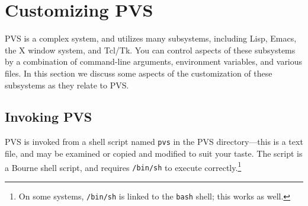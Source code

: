 \chapter{Customizing PVS}
\label{customization}

PVS is a complex system, and utilizes many subsystems, including Lisp,
Emacs, the X window system, and Tcl/Tk.  You can control aspects of these
subsystems by a combination of command-line arguments, environment
variables, and various files.  In this section we discuss some aspects of
the customization of these subsystems as they relate to PVS.

\section{Invoking PVS}\label{invoking-pvs}

PVS is invoked from a shell script named \texttt{pvs} in the PVS directory---this is a text file, and may be examined or
copied and modified to suit your taste.  The script is a Bourne shell
script, and requires {\tt /bin/sh} to execute correctly.\footnote{On some
systems, \texttt{/bin/sh} is linked to the \texttt{bash} shell; this works
as well.}

